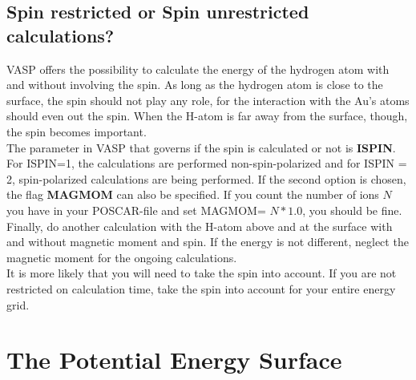 \documentclass[twoside, 11pt, titlepage, captions=nooneline, a4paper, headsepline]{scrbook}%
\newcommand{\9}{\mathrm}
\newcommand{\0}{\,\mathrm}
\begin{document}
\subsection{Spin restricted or Spin unrestricted calculations?}
VASP offers the possibility to calculate the energy of the hydrogen atom with and without involving the spin. As long as the hydrogen atom is close to the surface, the spin should not play any role, for the interaction with the Au's atoms should even out the spin. When the H-atom is far away from the surface, though, the spin becomes important.\\
The parameter in VASP that governs if the spin is calculated or not is \textbf{ISPIN}. For ISPIN=1, the calculations are performed non-spin-polarized and for ISPIN = 2, spin-polarized calculations are being performed. If the second option is chosen, the flag \textbf{MAGMOM} can also be specified. If you count the number of ions $N$ you have in your POSCAR-file and set MAGMOM= $N*1.0$, you should be fine.\\
Finally, do another calculation with the H-atom above and at the surface with and without magnetic moment and spin. If the energy is not different, neglect the magnetic moment for the ongoing calculations.\\
It is more likely that you will need to take the spin into account. If you are not restricted on calculation time, take the spin into account for your entire energy grid.


\section{The Potential Energy Surface}
\end{document}
